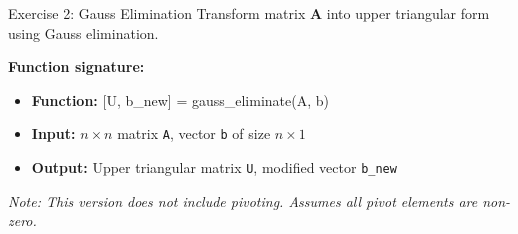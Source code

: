 \documentclass[aspectratio=169]{beamer}
\begin{document}
\begin{frame}{Exercise 2: Gauss Elimination}
	\textcolor{NavyBlue}{Transform matrix $\mathbf{A}$ into upper triangular form using Gauss elimination.}

	\vspace{0.2cm}
	\textbf{Function signature:}
	\begin{itemize}
		\item[] \textbf{Function:} [U, b\_new] = gauss\_eliminate(A, b)
		\item[] \textbf{Input:} $n \times n$ matrix \texttt{A}, vector \texttt{b} of size $n \times 1$
		\item[] \textbf{Output:} Upper triangular matrix \texttt{U}, modified vector \texttt{b\_new}
	\end{itemize}

	\textit{\alert{Note:} This version does not include pivoting. Assumes all pivot elements are non-zero.}
\end{frame}
\end{document}
